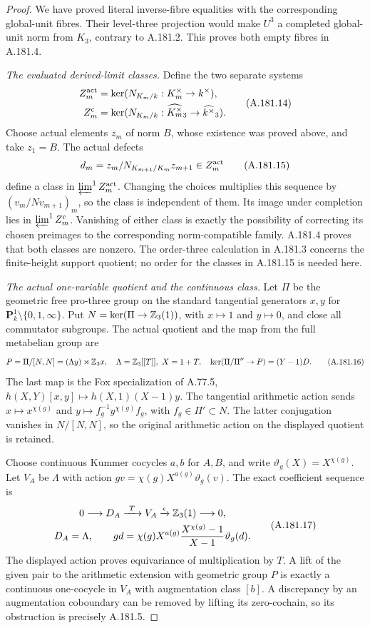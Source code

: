 \begin{proof}
We have proved literal inverse-fibre equalities with the
corresponding global-unit fibres.  Their level-three projection
would make \(U^3\) a completed global-unit norm from
\(K_3\), contrary to A.181.2.  This proves both empty
fibres in A.181.4.

\emph{The evaluated derived-limit classes.}
Define the two separate systems
\[
\begin{aligned}
 Z_m^{\rm act}&=\ker(N_{K_m/k}:K_m^\times\to k^\times),\\
 Z_m^{\rm c}&=\ker(N_{K_m/k}:\widehat{K_m^\times}_3
                                      \to\widehat{k^\times}_3).
\end{aligned}
\tag{A.181.14}
\]
Choose actual elements \(z_m\) of norm \(B\), whose existence
was proved above, and take \(z_1=B\).  The actual defects
\[
 d_m=z_m/N_{K_{m+1}/K_m}z_{m+1}\in Z_m^{\rm act}
\tag{A.181.15}
\]
define a class in \(\varprojlim^1 Z_m^{\rm act}\).
Changing the choices multiplies this sequence by
\((v_m/Nv_{m+1})_m\), so the class is independent of them.
Its image under completion lies in
\(\varprojlim^1 Z_m^{\rm c}\).  Vanishing of either
class is exactly the possibility of correcting its chosen
preimages to the corresponding norm-compatible family.
A.181.4 proves that both classes are nonzero.  The order-three
calculation in A.181.3 concerns the finite-height support
quotient; no order for the classes in A.181.15 is needed here.

\emph{The actual one-variable quotient and the continuous class.}
Let \(\Pi\) be the geometric free pro-three group on the
standard tangential generators \(x,y\) for
\(\mathbf P^1_k\setminus\{0,1,\infty\}\).
Put \(N=\ker(\Pi\to\mathbb Z_3(1))\), with \(x\mapsto1\)
and \(y\mapsto0\), and close all commutator subgroups.
The actual quotient and the map from the full metabelian
group are
\[
 P=\Pi/[N,N]=(\Lambda y)\rtimes\mathbb Z_3x,
 \quad\Lambda=\mathbb Z_3[[T]],\ X=1+T,
 \quad\ker(\Pi/\Pi''\to P)=(Y-1)D.
\tag{A.181.16}
\]
The last map is the Fox specialization of A.77.5,
\(h(X,Y)[x,y]\mapsto h(X,1)(X-1)y\).
The tangential arithmetic action sends
\(x\mapsto x^{\chi(g)}\) and
\(y\mapsto f_g^{-1}y^{\chi(g)}f_g\), with
\(f_g\in\Pi'\subset N\).  The latter conjugation
vanishes in \(N/[N,N]\), so the original arithmetic
action on the displayed quotient is retained.

Choose continuous Kummer cocycles \(a,b\) for \(A,B\),
and write \(\vartheta_g(X)=X^{\chi(g)}\).
Let \(V_A\) be \(\Lambda\) with action
\(g v=\chi(g)X^{a(g)}\vartheta_g(v)\).
The exact coefficient sequence is
\[
\begin{gathered}
 0\longrightarrow D_A\xrightarrow{\ T\ }V_A
       \xrightarrow{\epsilon}\mathbb Z_3(1)\longrightarrow0,\\
 D_A=\Lambda,\qquad
 gd=\chi(g)X^{a(g)}
       \frac{X^{\chi(g)}-1}{X-1}\vartheta_g(d).
\end{gathered}
\tag{A.181.17}
\]
The displayed action proves equivariance of multiplication
by \(T\).  A lift of the given pair to the arithmetic
extension with geometric group \(P\) is exactly a
continuous one-cocycle in \(V_A\) with augmentation
class \([b]\).  A discrepancy by an augmentation
coboundary can be removed by lifting its zero-cochain,
so its obstruction is precisely A.181.5.


\end{proof}
